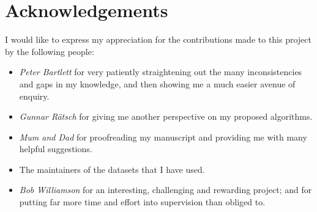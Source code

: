 
\chapter{Acknowledgements}

I would like to express my appreciation for the contributions made to
this project by the following people:

\begin{itemize}
\item	\emph{Peter Bartlett} for very patiently straightening out the
	many inconsistencies and gaps in my knowledge, and then
	showing me a much easier avenue of enquiry.

\item	\emph{Gunnar R\"{a}tsch} for giving me another perspective on
	my proposed algorithms.

\item	\emph{Mum and Dad} for proofreading my manuscript and
	providing me with many helpful suggestions.

\item	The maintainers of the datasets that I have used.

\item	\emph{Bob Williamson} for an interesting, challenging and
	rewarding project; and for putting far more time and effort
	into supervision than obliged to.
\end{itemize}
